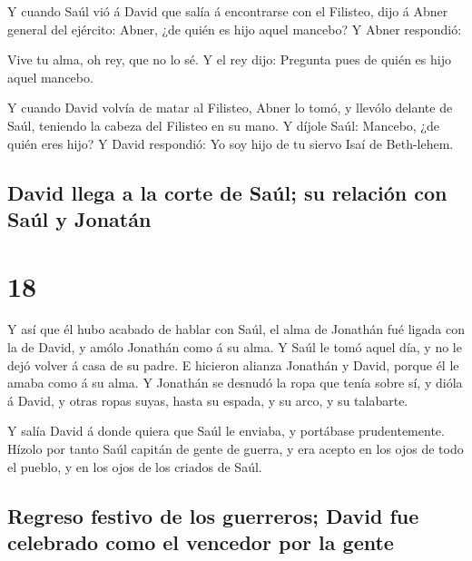  Y cuando Saúl vió á David que salía á encontrarse con el
Filisteo, dijo á Abner general del ejército: Abner, ¿de quién es hijo
aquel mancebo? Y Abner respondió:

 Vive tu alma, oh rey, que no lo sé. Y el rey dijo:
Pregunta pues de quién es hijo aquel mancebo.

 Y cuando David volvía de matar al Filisteo, Abner lo
tomó, y llevólo delante de Saúl, teniendo la cabeza del Filisteo en su
mano.  Y díjole Saúl: Mancebo, ¿de quién eres hijo? Y
David respondió: Yo soy hijo de tu siervo Isaí de Beth-lehem.

\hypertarget{david-llega-a-la-corte-de-sauxfal-su-relaciuxf3n-con-sauxfal-y-jonatuxe1n}{%
\subsection{David llega a la corte de Saúl; su relación con Saúl y
Jonatán}\label{david-llega-a-la-corte-de-sauxfal-su-relaciuxf3n-con-sauxfal-y-jonatuxe1n}}

\hypertarget{section-09-18}{%
\section{18}\label{section-09-18}}

 Y así que él hubo acabado de hablar con Saúl, el alma de
Jonathán fué ligada con la de David, y amólo Jonathán como á su alma.
 Y Saúl le tomó aquel día, y no le dejó volver á casa de
su padre.  E hicieron alianza Jonathán y David, porque él
le amaba como á su alma.  Y Jonathán se desnudó la ropa
que tenía sobre sí, y dióla á David, y otras ropas suyas, hasta su
espada, y su arco, y su talabarte.

 Y salía David á donde quiera que Saúl le enviaba, y
portábase prudentemente. Hízolo por tanto Saúl capitán de gente de
guerra, y era acepto en los ojos de todo el pueblo, y en los ojos de los
criados de Saúl.

\hypertarget{regreso-festivo-de-los-guerreros-david-fue-celebrado-como-el-vencedor-por-la-gente}{%
\subsection{Regreso festivo de los guerreros; David fue celebrado como
el vencedor por la
gente}\label{regreso-festivo-de-los-guerreros-david-fue-celebrado-como-el-vencedor-por-la-gente}}

